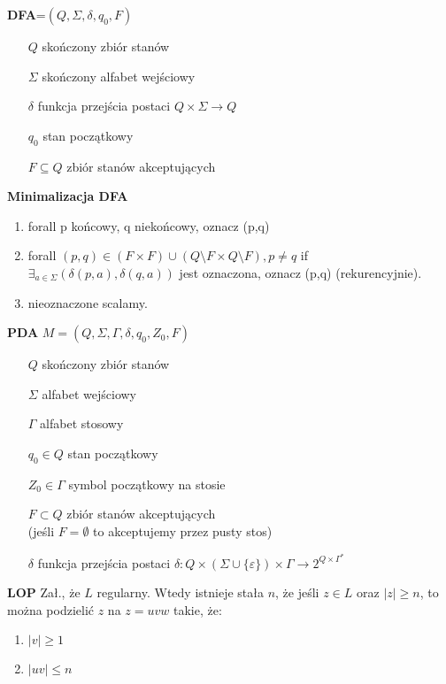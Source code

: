 
  \begin{multicols}{3}
    \textbf{DFA}=$(Q,\Sigma , \delta , q_{0},F)$
    \begin{enumerate}
      \item [$Q$]skończony zbiór stanów
      \item [$\Sigma$]skończony alfabet wejściowy 
      \item [$\delta$]funkcja przejścia postaci   $Q\times\Sigma \rightarrow Q$
      \item [$q_{0}$]stan początkowy
      \item [$F \subseteq Q$]zbiór stanów akceptujących
    \end{enumerate}
    \textbf{Minimalizacja DFA}
    \begin{enumerate}
      \item forall p końcowy, q niekońcowy, oznacz (p,q)
      \item forall $(p,q) \in (F\times F) \cup (Q\setminus F \times Q\setminus F ), p \neq q $ if $\exists_{a \in \Sigma} (\delta (p,a), \delta (q,a))$ jest oznaczona, oznacz (p,q) (rekurencyjnie).
      \item nieoznaczone scalamy.
    \end{enumerate}
    \textbf{PDA} $M=(Q,\Sigma , \Gamma , \delta , q_{0} , Z_{0} , F)$
    \begin{enumerate}
      \item[$Q$] skończony zbiór stanów
      \item[$\Sigma$] alfabet wejściowy
      \item[$\Gamma$] alfabet stosowy
      \item[$q_{0} \in Q$] stan początkowy
      \item[$Z_{0} \in \Gamma$] symbol początkowy na stosie
      \item[$F \subset Q$] zbiór stanów akceptujących \\(jeśli $F=\emptyset$ to akceptujemy przez pusty stos)
      \item[$\delta $] funkcja przejścia postaci $\delta: Q \times (\Sigma \cup \lbrace \varepsilon \rbrace)\times \Gamma \rightarrow 2^{Q\times \Gamma ^{*}}$
    \end{enumerate}
    \textbf{LOP } Zał., że $L$ regularny. Wtedy istnieje stała $n$, że jeśli $z \in L$ oraz $|z| \geqslant n$, to można podzielić $z$ na $z=uvw$ takie, że:
    \begin{enumerate}
      \item $|v| \geqslant 1$
      \item $|uv| \leqslant n$

\end{enumerate}
\end{multicols}
